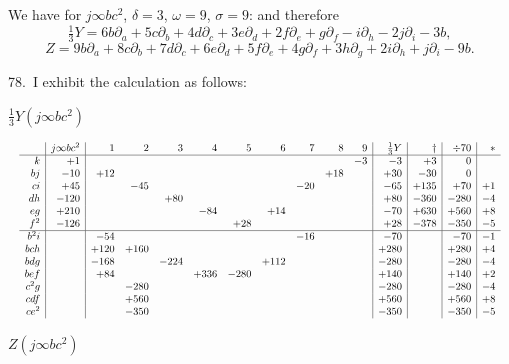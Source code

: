 \documentclass[11pt]{article}
\begin{document}
We have for $j \infty bc^2$, $\delta = 3$, $\omega = 9$, $\sigma = 9$: and therefore
\[
\tfrac{1}{3} Y = 6b\partial_a + 5c\partial_b + 4d\partial_c + 3e\partial_d + 2f\partial_e + g\partial_f - i\partial_h - 2j\partial_i - 3b,
\]
\[
Z = 9b\partial_a + 8c\partial_b + 7d\partial_c + 6e\partial_d + 5f\partial_e + 4g\partial_f + 3h\partial_g + 2i\partial_h + j\partial_i - 9b.
\]

\clearpage
78.\ I exhibit the calculation as follows:

\begin{center}
$\tfrac{1}{3} Y (j \infty bc^2)$
\end{center}

\[
\resizebox{\textwidth}{!}{$\displaystyle
\begin{array}{r|r|rrrrrrrrr|r|r|r|r}
&j\infty bc^2&1&2&3&4&5&6&7&8&9&
\tfrac13Y&\dagger&\div 70&*\\ \hline
k&+1&&&&&&&&&-3&-3&+3&0&\\
bj&-10&+12&&&&&&&+18&&+30&-30&0&\\
ci&+45&&-45&&&&&-20&&&-65&+135&+70&+1\\
dh&-120&&&+80&&&&&&&+80&-360&-280&-4\\
eg&+210&&&&-84&&+14&&&&-70&+630&+560&+8\\
f^2&-126&&&&&+28&&&&&+28&-378&-350&-5\\ \hline
b^2i&&-54&&&&&&-16&&&-70&&-70&-1\\
bch&&+120&+160&&&&&&&&+280&&+280&+4\\
bdg&&-168&&-224&&&+112&&&&-280&&-280&-4\\
bef&&+84&&&+336&-280&&&&&+140&&+140&+2\\
c^2g&&&-280&&&&&&&&-280&&-280&-4\\
cdf&&&+560&&&&&&&&+560&&+560&+8\\
ce^2&&&-350&&&&&&&&-350&&-350&-5
\end{array}
$}
\]

\medskip
\begin{center}
$Z (j \infty bc^2)$
\end{center}
\end{document}
